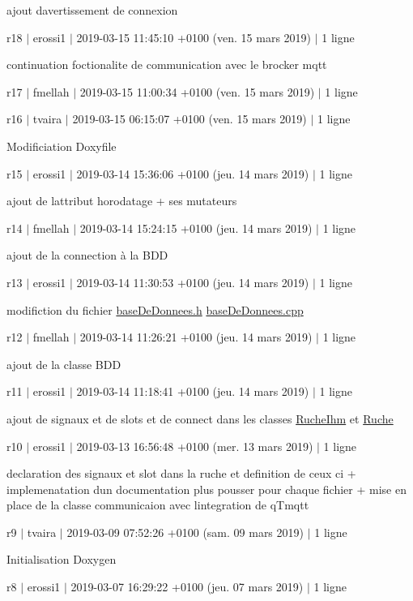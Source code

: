 ajout d\textquotesingle{}avertissement de connexion

r18 $\vert$ erossi1 $\vert$ 2019-\/03-\/15 11\+:45\+:10 +0100 (ven. 15 mars 2019) $\vert$ 1 ligne

continuation foctionalite de communication avec le brocker mqtt

r17 $\vert$ fmellah $\vert$ 2019-\/03-\/15 11\+:00\+:34 +0100 (ven. 15 mars 2019) $\vert$ 1 ligne

r16 $\vert$ tvaira $\vert$ 2019-\/03-\/15 06\+:15\+:07 +0100 (ven. 15 mars 2019) $\vert$ 1 ligne

Modificiation Doxyfile

r15 $\vert$ erossi1 $\vert$ 2019-\/03-\/14 15\+:36\+:06 +0100 (jeu. 14 mars 2019) $\vert$ 1 ligne

ajout de l\textquotesingle{}attribut horodatage + ses mutateurs

r14 $\vert$ fmellah $\vert$ 2019-\/03-\/14 15\+:24\+:15 +0100 (jeu. 14 mars 2019) $\vert$ 1 ligne

ajout de la connection à la B\+DD

r13 $\vert$ erossi1 $\vert$ 2019-\/03-\/14 11\+:30\+:53 +0100 (jeu. 14 mars 2019) $\vert$ 1 ligne

modifiction du fichier \hyperlink{base_de_donnees_8h}{base\+De\+Donnees.\+h} \hyperlink{base_de_donnees_8cpp}{base\+De\+Donnees.\+cpp}

r12 $\vert$ fmellah $\vert$ 2019-\/03-\/14 11\+:26\+:21 +0100 (jeu. 14 mars 2019) $\vert$ 1 ligne

ajout de la classe B\+DD

r11 $\vert$ erossi1 $\vert$ 2019-\/03-\/14 11\+:18\+:41 +0100 (jeu. 14 mars 2019) $\vert$ 1 ligne

ajout de signaux et de slots et de connect dans les classes \hyperlink{class_ruche_ihm}{Ruche\+Ihm} et \hyperlink{class_ruche}{Ruche}

r10 $\vert$ erossi1 $\vert$ 2019-\/03-\/13 16\+:56\+:48 +0100 (mer. 13 mars 2019) $\vert$ 1 ligne

declaration des signaux et slot dans la ruche et definition de ceux ci + implemenatation d\textquotesingle{}un documentation plus pousser pour chaque fichier + mise en place de la classe communicaion avec l\textquotesingle{}integration de q\+Tmqtt

r9 $\vert$ tvaira $\vert$ 2019-\/03-\/09 07\+:52\+:26 +0100 (sam. 09 mars 2019) $\vert$ 1 ligne

Initialisation Doxygen

r8 $\vert$ erossi1 $\vert$ 2019-\/03-\/07 16\+:29\+:22 +0100 (jeu. 07 mars 2019) $\vert$ 1 ligne

